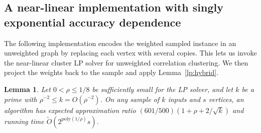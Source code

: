 \documentclass[11pt]{article}
\newtheorem{lemma}[theorem]{Lemma}
\begin{document}
\subsection{A near-linear implementation with singly exponential accuracy dependence}
\label{app:near-linear}

The following implementation encodes the weighted sampled instance
in an unweighted graph by replacing each vertex with several
copies. This lets us invoke the near-linear cluster LP solver for
unweighted correlation clustering. We then project the weights
back to the sample and apply Lemma~\ref{lp:hybrid}.

\begin{lemma}\label{lift:empirical}
Let $0<\rho\le1/8$ be sufficiently small for the LP solver, and let $k$ be a prime with
$\rho^{-2}\le k=O(\rho^{-2})$. On any sample of $k$ inputs and $s$ vertices, an algorithm has expected
approximation ratio $(601/500)(1+\rho+2/\sqrt{k})$ and running time
$\widetilde O(2^{\mathrm{poly}(1/\rho)}s)$.
\end{lemma}
\end{document}
